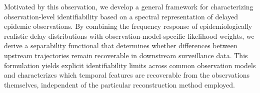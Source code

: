 Motivated by this observation, we develop a general framework for characterizing observation-level identifiability based on a spectral representation of delayed epidemic observations. By combining the frequency response of epidemiologically realistic delay distributions with observation-model-specific likelihood weights, we derive a separability functional that determines whether differences between upstream trajectories remain recoverable in downstream surveillance data. This formulation yields explicit identifiability limits across common observation models and characterizes which temporal features are recoverable from the observations themselves, independent of the particular reconstruction method employed.
